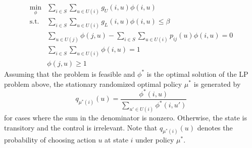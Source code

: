 \begin{equation}\label{CompleteCMDP}
\begin{array}{ll}
\underset{\phi}\min & \displaystyle\sum_{i\in S}\displaystyle\sum_{u\in U(i)}g_{U}\left(i,u\right)\phi\left(i,u\right) \\
\text{s.t.} & \displaystyle\sum_{i\in S}\displaystyle\sum_{u\in U(i)}g_{L}\left(i,u\right)\phi\left(i,u\right) \leq \beta\\
& \displaystyle\sum_{u\in U(j)}\phi\left(j,u\right) - \displaystyle\sum_{i\in S}\displaystyle\sum_{u\in U(i)}p_{ij}\left(u\right)\phi\left(i,u\right) = 0 \\
& \displaystyle\sum_{i\in S}\displaystyle\sum_{u\in U(i)}\phi\left(i,u\right) = 1\\
& \phi\left(j,u\right) \geq 1
\end{array}
\end{equation}
Assuming that the problem is feasible and $\phi^{*}$ is the optimal solution of the LP problem above, the stationary randomized optimal policy $\mu^{*}$ is generated by
\begin{equation}
q_{\mu^{*}\left(i\right)}\left(u\right)=\displaystyle\frac{\phi^{*}\left(i,u\right)}{\sum_{u' \in U(i)}\phi^{*}\left(i,u'\right)}
\end{equation}
for cases where the sum in the denominator is nonzero. Otherwise, the state is transitory and the control is irrelevant. Note that $q_{\mu^{*}\left(i\right)}\left(u\right)$ denotes the probability of choosing action $u$ at state $i$ under policy $\mu^{*}$.

